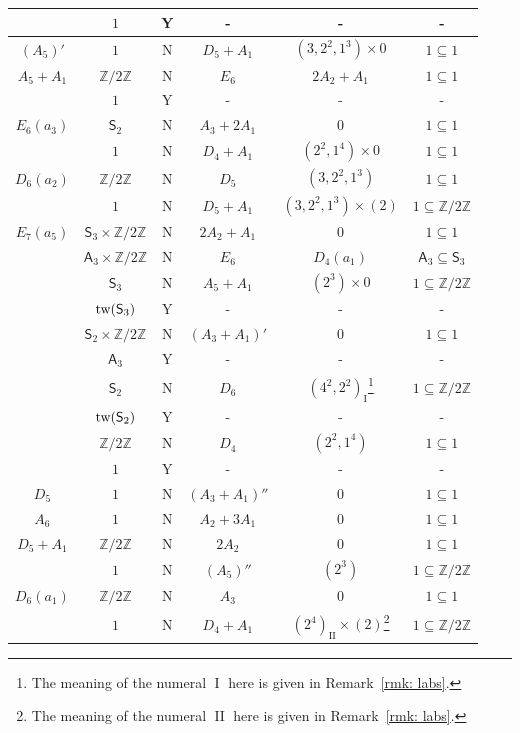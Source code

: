 \documentclass[11pt]{amsart}
\newcommand{\bZ}{{\mathbb Z}}
\newcommand{\I}{{\mathfrak I}}
\newcommand{\II}{{\operatorname{II}}}
\renewcommand{\I}{{\operatorname{I}}}
\newcommand{\Alt}{{\mathsf{A}}}
\newcommand{\Sym}{{\mathsf{S}}}
\newcommand{\tw}{{{\mbox{\rm tw}}}}
\numberwithin{equation}{section}
\begin{document}
\begin{center}
\begin{longtable}{|c|c|c|c|c|c|}
			& $1$ & Y & - & - & - \\
			\hline
			$(A_5)'$ & $1$ & N & $D_5 + A_1$ & $(3,2^2,1^3)\times 0$ & $1\subseteq 1$ \\
			\hline
			$A_5+A_1$ & $\bZ/2\bZ$ & N & $E_6$ & $2A_2+A_1$ & $1\subseteq 1$ \\
			& $1$ & Y & - & - & - \\
			\hline
			$E_6(a_3)$ & $\Sym_2$ & N & $A_3 + 2 A_1$ & $0$ & $1\subseteq 1$ \\
			& $1$ & N & $D_4 + A_1$ & $(2^2,1^4)\times 0$ & $1\subseteq 1$ \\
			\hline
			$D_6(a_2)$ & $\bZ/2\bZ$ & N & $D_5$ & $(3,2^2,1^3)$ & $1\subseteq 1$\\
			& $1$ & N & $D_5 + A_1$ & $(3,2^2,1^3)\times (2)$ & $1\subseteq \bZ/2\bZ$ \\
			\hline
			$E_7(a_5)$ & $\Sym_3\times \bZ/2\bZ$ & N & $2 A_2 + A_1$ & $0$ & $1\subseteq 1$ \\
			& $\Alt_3\times\bZ/2\bZ$ & N & $E_6$ & $D_4(a_1)$ & $\Alt_3\subseteq \Sym_3$ \\
			& $\Sym_3$ & N & $A_5+A_1$ & $(2^3) \times 0$ & $1\subseteq \bZ/2\bZ$ \\
			& $\tw(\Sym_3)$ & Y & - & - & - \\
			& $\Sym_2\times \bZ/2\bZ$ & N & $(A_3 + A_1)'$ & $0$ & $1\subseteq 1$ \\
			& $\Alt_3$ & Y & - & - &  -\\
			& $\Sym_2$ & N & $D_6$ & $(4^2,2^2)_\I$\footnote{The meaning of the numeral $\I$ here is given in Remark~\ref{rmk: labs}.}& $1\subseteq \bZ/2\bZ$ \\
			& $\tw(\Sym_2)$ & Y & - & - & - \\
			& $\bZ/2\bZ$ & N & $D_4$ & $(2^2,1^4)$ & $1\subseteq 1$\\
			& $1$ & Y & - & - & - \\
			\hline
			$D_5$ & $1$ & N & $(A_3 + A_1)''$ & $0$ & $1\subseteq 1$ \\
			\hline
			$A_6$ & $1$ & N & $A_2 + 3 A_1$ & $0$ & $1\subseteq 1$ \\
			\hline
			$D_5+A_1$ & $\bZ/2\bZ$ & N & $2 A_2$ & $0$ & $1\subseteq 1$ \\
			& $1$ & N & $(A_5)''$ & $(2^3)$ & $1\subseteq \bZ/2\bZ$ \\
			\hline
			$D_6(a_1)$ & $\bZ/2\bZ$ & N & $A_3$ & $0$ & $1\subseteq 1$ \\
			& $1$ & N & $D_4 + A_1$ & $(2^4)_\II\times (2)$\footnote{The meaning of the numeral $\II$ here is given in Remark~\ref{rmk: labs}.} & $1\subseteq \bZ/2\bZ$ \\

\end{longtable}
\end{center}
\end{document}
